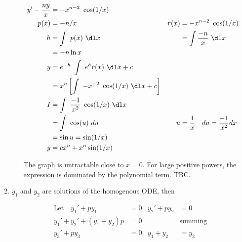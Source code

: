 \begin{enumerate}
\begin{enumerate}
                    \begin{align}
                        y' - \frac{ny}{x} & = -x^{n-2}\ \cos(1/x)                                                                                          \\
                        p(x)              & = -n/x                                                     & r(x) & = -x^{n-2}\ \cos(1/x)                      \\
                        h                 & = \int\ p(x)\ \dl x                                        &      & = \int \frac{-n}{x}\ \dl x                 \\
                                          & = -n\ln x                                                                                                      \\
                        y                 & = e^{-h}\ \int\ e^{h}r(x)\ \dl x + c                                                                           \\
                                          & = x^{n} \left[ \int\ -x^{-2}\ \cos(1/x)\ \dl x + c \right]                                                     \\
                        I                 & =\int\ \frac{-1}{x^{2}}\ \cos(1/x)\ \dl x                                                                      \\
                                          & =\int\ \cos(u)\ du                                         & u    & = \frac{1}{x}\quad du = \frac{-1}{x^{2}}dx \\
                                          & = \sin u = \sin(1/x)                                                                                           \\
                        y                 & = cx^{n} + x^{n}\sin(1/x)
                    \end{align}

                    The graph is untractable close to $ x = 0 $. For large positive powers, the expression
                    is dominated by the polynomial term. TBC.
          \end{enumerate}

    \item $ y_{1} $ and $ y_{2} $ are solutions of the homogenous ODE, then

          \begin{align}
              \text{Let} \quad y_{1}' + py_{1}   & = 0 & y_{2}' + py_{2} & = 0            \\
              y_{1}' + y_{2}' + (y_{1} + y_{2})p & = 0 &                 & \text{summing} \\
              y_{3}' + py_{3}                    & = 0 & y_{1} + y_{2}   & = y_{3}
          \end{align}


\end{enumerate}
